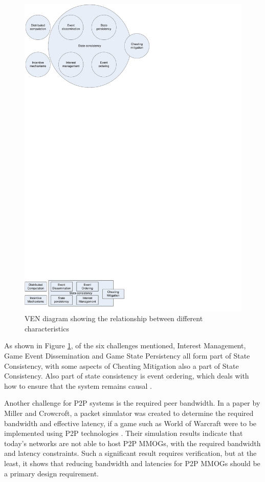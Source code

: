 \documentclass[10pt,a4paper,journal,cspaper,compsoc]{IEEEtran}
\begin{document}
\begin{figure}[htbp]
 \centering
 \includegraphics[clip=true, viewport=0cm 0cm 10cm 3cm, width=\columnwidth]{Component_VEN}
 \caption{VEN diagram showing the relationship between different characteristics}
 \label{fig_component_ven}
\end{figure}
%
As shown in Figure \ref{fig_component_ven}, of the six challenges mentioned, Interest Management, Game Event Dissemination and Game State Persistency
all form part of State Consistency, with some aspects of Cheating Mitigation also a part of State Consistency. Also part of state consistency is
event ordering, which deals with how to ensure that the system remains causal \cite{GauthierDickey_low_latency_event_ordering}.

Another challenge for P2P systems is the required peer bandwidth. In a paper by Miller and Crowcroft, a packet simulator was created to determine the
required bandwidth and effective latency, if a game such as World of Warcraft were to be implemented using P2P technologies
\cite{Miller_p2p_infeasability}. Their simulation results indicate that today's networks are not able to host P2P MMOGs, with the required bandwidth
and latency constraints. Such a significant result requires verification, but at the least, it shows that reducing bandwidth and latencies for P2P
MMOGs should be a primary design requirement.
\end{document}
